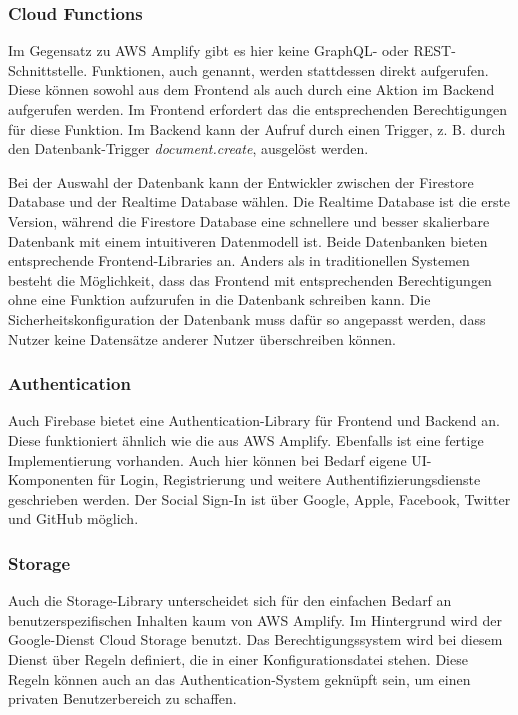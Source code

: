 \begin{itemize}
\subsubsection{Cloud Functions}

Im Gegensatz zu \ac{AWS} Amplify gibt es hier keine GraphQL- oder \acs{REST}-Schnittstelle. Funktionen, auch  genannt, werden stattdessen direkt aufgerufen. Diese können sowohl aus dem Frontend als auch durch eine Aktion im Backend aufgerufen werden. Im Frontend erfordert das die entsprechenden Berechtigungen für diese Funktion. Im Backend kann der Aufruf durch einen Trigger, z. B. durch den Datenbank-Trigger \textit{document.create}, ausgelöst werden.

Bei der Auswahl der Datenbank kann der Entwickler zwischen der Firestore Database und der Realtime Database wählen. Die Realtime Database ist die erste Version, während die Firestore Database eine schnellere und besser skalierbare Datenbank mit einem intuitiveren Datenmodell ist. Beide Datenbanken bieten entsprechende Frontend-Libraries an. Anders als in traditionellen Systemen besteht die Möglichkeit, dass das Frontend mit entsprechenden Berechtigungen ohne eine Funktion aufzurufen in die Datenbank schreiben kann. Die Sicherheitskonfiguration der Datenbank muss dafür so angepasst werden, dass Nutzer keine Datensätze anderer Nutzer überschreiben können.

\subsubsection{Authentication}

Auch Firebase bietet eine Authentication-Library für Frontend und Backend an. Diese funktioniert ähnlich wie die aus \ac{AWS} Amplify. Ebenfalls ist eine fertige Implementierung vorhanden. Auch hier können bei Bedarf eigene UI-Komponenten für Login, Registrierung und weitere Authentifizierungsdienste geschrieben werden. Der Social Sign-In ist über Google, Apple, Facebook, Twitter und GitHub möglich.

\subsubsection{Storage}

Auch die Storage-Library unterscheidet sich für den einfachen Bedarf an benutzerspezifischen Inhalten kaum von \ac{AWS} Amplify. Im Hintergrund wird der Google-Dienst Cloud Storage benutzt. Das Berechtigungssystem wird bei diesem Dienst über Regeln definiert, die in einer Konfigurationsdatei stehen. Diese Regeln können auch an das Authentication-System geknüpft sein, um einen privaten Benutzerbereich zu schaffen.


\end{itemize}
